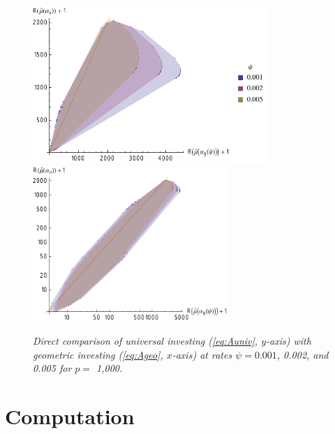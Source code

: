 \documentclass[12pt]{article}
\begin{document}
 \begin{figure}
 \caption{ \label{fig:univGeo} {\sl Direct comparison of universal investing
 (\ref{eq:Auniv}, $y$-axis) with geometric investing (\ref{eq:Ageo}, $x$-axis) at
 rates $\psi = 0.001$, 0.002, and 0.005 for $p=$ 1,000.}  }

 \vspace{0.1in}
 \centerline{
     \includegraphics[width=3.5in]{figures/univGeo}
     \includegraphics[width=2.9in]{figures/univGeoLog} }
 \vspace{0.2in}
 \end{figure}



\section{ Computation }
\end{document}

